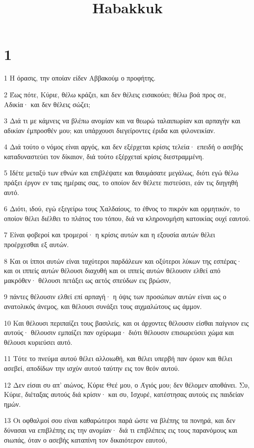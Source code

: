 

\title{Habakkuk}


\chapter{1}

\par 1 Η όρασις, την οποίαν είδεν Αββακούμ ο προφήτης.
\par 2 Έως πότε, Κύριε, θέλω κράζει, και δεν θέλεις εισακούει; θέλω βοά προς σε, Αδικία· και δεν θέλεις σώζει;
\par 3 Διά τι με κάμνεις να βλέπω ανομίαν και να θεωρώ ταλαιπωρίαν και αρπαγήν και αδικίαν έμπροσθέν μου; και υπάρχουσι διεγείροντες έριδα και φιλονεικίαν.
\par 4 Διά τούτο ο νόμος είναι αργός, και δεν εξέρχεται κρίσις τελεία· επειδή ο ασεβής καταδυναστεύει τον δίκαιον, διά τούτο εξέρχεταί κρίσις διεστραμμένη.
\par 5 Ιδέτε μεταξύ των εθνών και επιβλέψατε και θαυμάσατε μεγάλως, διότι εγώ θέλω πράξει έργον εν ταις ημέραις σας, το οποίον δεν θέλετε πιστεύσει, εάν τις διηγηθή αυτό.
\par 6 Διότι, ιδού, εγώ εξεγείρω τους Χαλδαίους, το έθνος το πικρόν και ορμητικόν, το οποίον θέλει διέλθει το πλάτος του τόπου, διά να κληρονομήση κατοικίας ουχί εαυτού.
\par 7 Είναι φοβεροί και τρομεροί· η κρίσις αυτών και η εξουσία αυτών θέλει προέρχεσθαι εξ αυτών.
\par 8 Και οι ίπποι αυτών είναι ταχύτεροι παρδάλεων και οξύτεροι λύκων της εσπέρας· και οι ιππείς αυτών θέλουσι διαχυθή και οι ιππείς αυτών θέλουσιν ελθεί από μακρόθεν· θέλουσι πετάξει ως αετός σπεύδων εις βρώσιν,
\par 9 πάντες θέλουσιν ελθεί επί αρπαγή· η όψις των προσώπων αυτών είναι ως ο ανατολικός άνεμος, και θέλουσι συνάξει τους αιχμαλώτους ως άμμον.
\par 10 Και θέλουσι περιπαίζει τους βασιλείς, και οι άρχοντες θέλουσιν είσθαι παίγνιον εις αυτούς· θέλουσιν εμπαίζει παν οχύρωμα· διότι θέλουσιν επισωρεύσει χώμα και θέλουσι κυριεύσει αυτό.
\par 11 Τότε το πνεύμα αυτού θέλει αλλοιωθή, και θέλει υπερβή παν όριον και θέλει ασεβεί, αποδίδων την ισχύν αυτού ταύτην εις τον θεόν αυτού.
\par 12 Δεν είσαι συ απ' αιώνος, Κύριε Θεέ μου, ο Άγιός μου; δεν θέλομεν αποθάνει. Συ, Κύριε, διέταξας αυτούς διά κρίσιν· και συ, Ισχυρέ, κατέστησας αυτούς εις παιδείαν ημών.
\par 13 Οι οφθαλμοί σου είναι καθαρώτεροι παρά ώστε να βλέπης τα πονηρά, και δεν δύνασαι να επιβλέπης εις την ανομίαν· διά τι επιβλέπεις εις τους παρανόμους και σιωπάς, όταν ο ασεβής καταπίνη τον δικαιότερον εαυτού,
